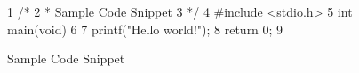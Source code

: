 \begin{figure}[tbh]
{ \scriptsize
\begin{verbbox}
  1 /*
  2  * Sample Code Snippet
  3  */
  4  #include <stdio.h>
  5  int main(void)
  6  {
  7    printf("Hello world!\n");
  8    return 0;
  9  }
\end{verbbox}
}
\centering
\theverbbox
\caption{Sample Code Snippet}
\label{fig:app:styleguide:Sample Code Snippet}
\end{figure}
